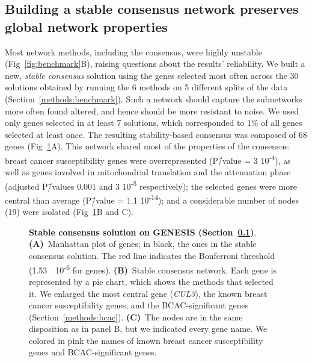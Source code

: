 \documentclass[10pt,letterpaper]{article}
\begin{document}
\subsection{Building a stable consensus network preserves global network properties}
\label{results:stable-consensus}

Most network methods, including the consensus, were highly unstable (Fig~\ref{fig:benchmark}B), raising questions about the results' reliability. We built a new, \emph{stable consensus} solution using the genes selected most often across the 30 solutions obtained by running the 6 methods on 5 different splits of the data (Section~\ref{methods:benchmark}). Such a network should capture the subnetworks more often found altered, and hence should be more resistant to noise. We used only genes selected in at least 7 solutions, which corresponded to 1\% of all genes selected at least once. The resulting stability-based consensus was composed of 68 genes (Fig~\ref{fig:stable-consensus}A). This network shared most of the properties of the consensus: breast cancer susceptibility genes were overrepresented (P\=/value = 3 \texttimes{} 10\textsuperscript{-4}), as well as genes involved in mitochondrial translation and the attenuation phase (adjusted P\=/values 0.001 and 3 \texttimes{} 10\textsuperscript{-5} respectively); the selected genes were more central than average (P\=/value = 1.1 \texttimes{} 10\textsuperscript{-14}); and a considerable number of nodes (19) were isolated (Fig~\ref{fig:stable-consensus}B and C).

\begin{figure}[!ht]
  \centering
  \caption{ \textbf{Stable consensus solution on GENESIS (Section~\ref{results:stable-consensus})}. \textbf{(A)}~Manhattan plot of genes; in black, the ones in the stable consensus solution. The red line indicates the Bonferroni threshold (1.53~\texttimes{}~10\textsuperscript{-6} for genes). \textbf{(B)}~Stable consensus network. Each gene is represented by a pie chart, which shows the methods that selected it. We enlarged the most central gene (\emph{CUL3}), the known breast cancer susceptibility genes, and the BCAC-significant genes (Section~\ref{methods:bcac}). \textbf{(C)}~The nodes are in the same disposition as in panel B, but we indicated every gene name. We colored in pink the names of known breast cancer susceptibility genes and BCAC-significant genes.}
  \label{fig:stable-consensus}
  \end{figure}
\end{document}
